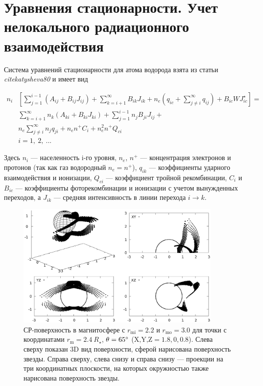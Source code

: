 \documentclass{article}
\begin{document}
\section{Уравнения стационарности. Учет нелокального радиационного взаимодействия}

Система уравнений стационарности для атома водорода взята из статьи \textit{cite{katysheva80}} и имеет вид

 
\begin{align} \label{eq:stat}
n_i & \left[ \sum\limits_{j=1}^{i-1} (A_{ij} + B_{ij}J_{ij}) + \sum\limits_{k=i+1}^\infty B_{ik}J_{ik} + n_e ( q_{ic} + \sum\limits_{j \neq i}^\infty q_{ij} ) + B_{ic}WJ_{ic}^\star \right] = \nonumber \\
 & \sum\limits_{k=i+1}^\infty n_k (A_{ki} + B_{ki}J_{ki}) + \sum\limits_{j=1}^{i-1} n_jB_{ji}J_{ij} + \nonumber \\
 & n_e \sum\limits_{j\neq i}^\infty n_jq_{ji} + n_en^+C_i + n_e^2n^+Q_{ci} \\
 & i=1,\ 2,\ ... \nonumber
\end{align}

Здесь $n_i$ --- населенность i-го уровня, $n_e$, $n^+$ --- концентрация электронов и протонов (так как газ водородный $n_e = n^+$), $q_{ik}$ --- коэффициенты ударного взаимодействия и ионизации, $Q_{ci}$ --- коэффициент тройной рекомбинации, $C_i$ и $B_{ic}$ --- коэффициенты фоторекомбинации и ионизации с учетом вынужденных переходов, а $J_{ik}$ --- средняя интенсивность в линии перехода $i\rightarrow k$.  

\begin{figure}[h]
\centering

\includegraphics[width=0.9\textwidth]{surf.eps}
\caption{СР-поверхность в магнитосфере с $r_\text{mi} = 2.2$ и $r_\text{mo} = 3.0$ для точки с координатами $r_\text{m} = 2.4\ R_\star$, $\theta = 65\degree$ ($\text{X,Y,Z} = 1.8,0,0.8$). Слева сверху показан 3D вид поверхности, сферой нарисована поверхность звезды. Справа сверху, слева снизу и справа снизу --- проекции на три координатных плоскости, на которых окружностью также нарисована поверхность звезды.}
\label{fig:CPsurf}
\end{figure}
\end{document}
